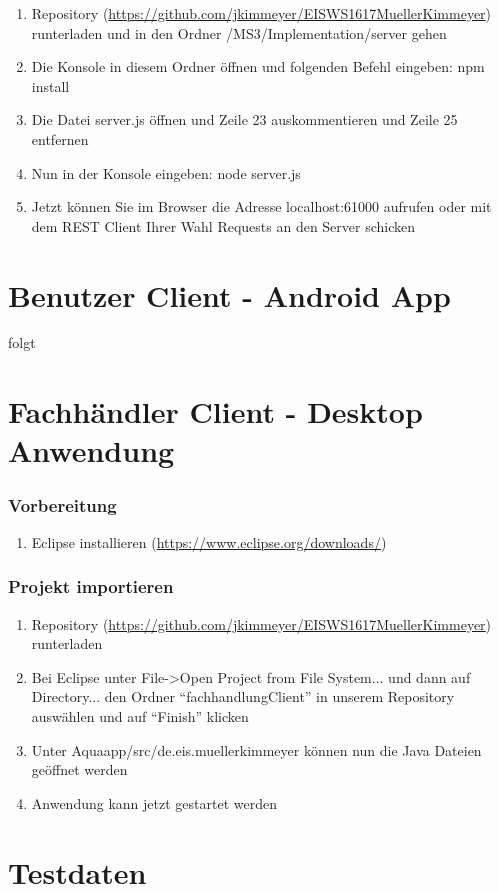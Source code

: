 \begin{enumerate}
\item Repository (\url{https://github.com/jkimmeyer/EISWS1617MuellerKimmeyer}) runterladen und in den Ordner /MS3/Implementation/server gehen
\item Die Konsole in diesem Ordner öffnen und folgenden Befehl eingeben: npm install
\item Die Datei server.js öffnen und Zeile 23 auskommentieren und Zeile 25 entfernen
\item Nun in der Konsole eingeben: node server.js
\item Jetzt können Sie im Browser die Adresse localhost:61000 aufrufen oder mit dem REST Client Ihrer Wahl Requests an den Server schicken
\end{enumerate}

\section{Benutzer Client - Android App}

folgt

\section{Fachhändler Client - Desktop Anwendung}

\subsubsection{Vorbereitung}

\begin{enumerate}
\item Eclipse installieren (\url{https://www.eclipse.org/downloads/})
\end{enumerate}

\subsubsection{Projekt importieren}

\begin{enumerate}
\item Repository (\url{https://github.com/jkimmeyer/EISWS1617MuellerKimmeyer}) runterladen
\item Bei Eclipse unter File->Open Project from File System... und dann auf Directory... den Ordner ``fachhandlungClient'' in unserem Repository auswählen und auf ``Finish'' klicken
\item Unter Aquaapp/src/de.eis.muellerkimmeyer können nun die Java Dateien geöffnet werden
\item Anwendung kann jetzt gestartet werden
\end{enumerate}

\section{Testdaten}